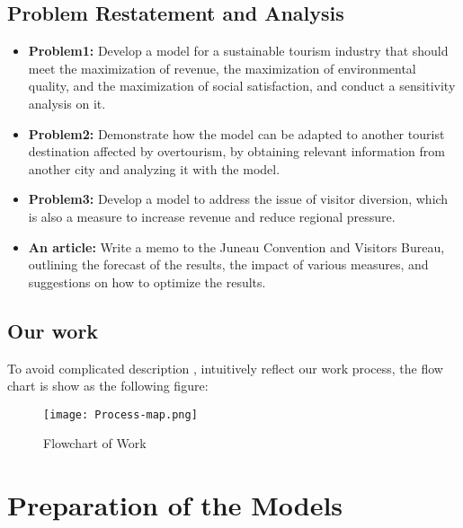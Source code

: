 \documentclass[12pt]{article}  %
\begin{document}
\subsection{Problem Restatement and Analysis}
\begin{itemize}
    \item \textbf{Problem1: }Develop a model for a sustainable tourism industry that should meet the maximization of revenue, the maximization of environmental quality, and the maximization of social satisfaction, and conduct a sensitivity analysis on it.
    \item \textbf{Problem2: }Demonstrate how the model can be adapted to another tourist destination affected by overtourism, by obtaining relevant information from another city and analyzing it with the model.
    \item \textbf{Problem3: }Develop a model to address the issue of visitor diversion, which is also a measure to increase revenue and reduce regional pressure.
    \item \textbf{An article: }Write a memo to the Juneau Convention and Visitors Bureau, outlining the forecast of the results, the impact of various measures, and suggestions on how to optimize the results.
\end{itemize}

\subsection{Our work}
To avoid complicated description , intuitively reflect our work process, the flow chart is show
as the following figure:
\begin{figure}[H]
	\centering
	\texttt{[image: Process-map.png]}
	\caption{Flowchart of Work}\label{fig:Process-map}
\end{figure}

\section{Preparation of the Models}
\end{document}
